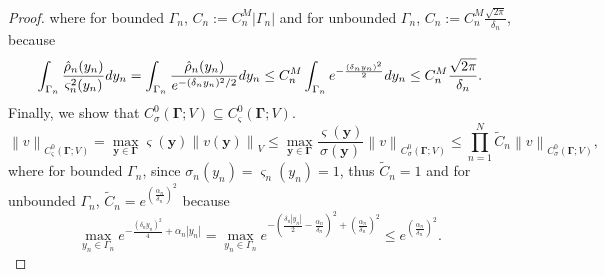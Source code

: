 \documentclass[final,onefignum,onetabnum]{mousaviart}
\begin{document}
\begin{proof}
			where for bounded $\Gamma_n$, $C_n := C^{M}_n \left| \Gamma_n\right| $ and for unbounded $\Gamma_n$, $C_n := C^{M}_n \frac{\sqrt{2\pi}}{\delta_n}$, because 
			\begin{equation*}
				\int_{\Gamma_n}\dfrac{\hat{\rho}_n(y_n)}{\varsigma_n^2(y_n)} dy_n 
				= 
				\int_{\Gamma_n} \dfrac{\hat{\rho}_n(y_n)}{e^{-(\delta_n y_n)^2/2 }}  dy_n
				\leq
				C^{M}_n \int_{\Gamma_n} e^{-\frac{(\delta_n y_n)^2}{2}} dy_n
				\\
				\leq
				C^{M}_n \dfrac{\sqrt{2\pi}}{\delta_n}.
			\end{equation*}
			Finally, we show that $C_\sigma^0(\boldsymbol{\Gamma}; V) \subseteq C_\varsigma^0(\boldsymbol{\Gamma}; V) $.
			\begin{equation*}
				\left\| v  \right\|_{C_{\varsigma}^0(\boldsymbol{\Gamma}; V)}
				=
				\max_{\boldsymbol{y} \in \boldsymbol{\Gamma}}  \varsigma(\boldsymbol{y}) \left\| v(\boldsymbol{y}) \right\|_V  
				\leq
				\max_{\boldsymbol{y} \in \boldsymbol{\Gamma}}   \dfrac{\varsigma(\boldsymbol{y})}{\sigma(\boldsymbol{y})} 
				\left\| v  \right\|_{C_{\sigma}^0(\boldsymbol{\Gamma}; V)}
				\leq
				\prod_{n=1}^{N}\tilde{C}_n 
				\left\| v  \right\|_{C_{\sigma}^0(\boldsymbol{\Gamma}; V)},
			\end{equation*}
			where for bounded $\Gamma_n$, since $\sigma_n(y_n)=\varsigma_n(y_n)=1 $, thus $\tilde{C}_n=1$ and for unbounded $\Gamma_n$, $\tilde{C}_n= e^{\left( \frac{\alpha_n}{\delta_n} \right)^2 }$ because
			\begin{equation*}
				\max_{y_n \in \Gamma_n}  e^{-\frac{(\delta_n y_n)^2}{4}  + \alpha_n \left| y_n\right| } 
				=
				\max_{y_n \in \Gamma_n}   e^{-\left( \frac{\delta_n \left| y_n\right| }{2}  - \frac{\alpha_n}{\delta_n} \right)^2 + \left( \frac{\alpha_n}{\delta_n}\right)^2  }  
				\leq
				e^{\left( \frac{\alpha_n}{\delta_n} \right)^2 }.
			\end{equation*}
		\end{proof}
		
\end{document}
